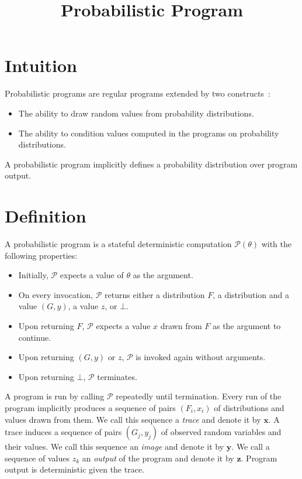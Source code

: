 \documentclass[a4paper,oneside]{article}
\title{Probabilistic Program}
\author {}
\begin{document}
\maketitle

\section*{Intuition}

Probabilistic programs are regular programs extended by two
constructs~\cite{GHNR14}:
\begin{itemize}
	\item The ability to draw random values from probability
		distributions.
	\item The ability to condition values computed in the
		programs on probability distributions.
\end{itemize}
A probabilistic program implicitly defines a probability
distribution over program output.

\section*{Definition}

A probabilistic program is a stateful deterministic
computation $\mathcal{P}(\theta)$ with the following properties:

\begin{itemize}
	\item Initially, $\mathcal{P}$ expects a value of $\theta$
		as the argument.
	\item On every invocation, $\mathcal{P}$ returns either a
		distribution $F$, a distribution and a value $(G, y)$, a
		value $z$, or $\bot$.
	\item Upon returning $F$, $\mathcal{P}$ expects a value $x$
		drawn from $F$ as the argument to continue.
	\item Upon returning $(G, y)$ or $z$, $\mathcal{P}$ is
		invoked again without arguments.
	\item Upon returning $\bot$, $\mathcal{P}$ terminates.
\end{itemize}

A program is run by calling $\mathcal{P}$ repeatedly until
termination. Every run of the program implicitly produces a
sequence of pairs $(F_i, x_i)$ of distributions and values drawn
from them. We call this sequence a \textit{trace} and denote it
by $\pmb{x}$.  A trace induces a sequence of pairs $(G_j, y_j)$
of observed random variables and their values.  We call this
sequence an \textit{image} and denote it by $\pmb{y}$. We call a
sequence of values $z_k$ an \textit{output} of the program and
denote it by $\pmb{z}$.  Program output is deterministic given
the trace.
\end{document}
